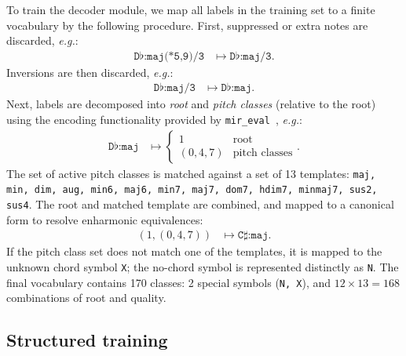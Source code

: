 \documentclass{article}
\def\eg{\emph{e.g.\/}}
\begin{document}
To train the decoder module, we map all labels in the training set to a finite vocabulary by the following procedure.
First, suppressed or extra notes are discarded, \eg:
\begin{align*}
    \texttt{D}\flat\texttt{:maj(*5,9)/3} &\mapsto \texttt{D}\flat\texttt{:maj/3}.
\end{align*}
Inversions are then discarded, \eg:
\begin{align*}
    \texttt{D}\flat\texttt{:maj/3} &\mapsto \texttt{D}\flat\texttt{:maj}.
\end{align*}
Next, labels are decomposed into \emph{root} and \emph{pitch classes} (relative to the root) using the encoding functionality provided by \texttt{mir\_eval}~\cite{raffel2014mir_eval}, \eg:
\begin{align*}
    \texttt{D}\flat\texttt{:maj} &\mapsto \begin{cases}
        1 & \text{root}\\
        (0, 4, 7) & \text{pitch classes}
    \end{cases}.
\end{align*}
The set of active pitch classes is matched against a set of 13 templates: \texttt{maj, min, dim, aug, min6, maj6, min7, maj7, dom7, hdim7, minmaj7, sus2, sus4}.
The root and matched template are combined, and mapped to a canonical form to resolve enharmonic equivalences:
\begin{align*}
    \left(1, (0, 4, 7) \right) &\mapsto \texttt{C}\sharp\texttt{:maj}.
\end{align*}
If the pitch class set does not match one of the templates, it is mapped to the unknown chord symbol \texttt{X}; the no-chord symbol is represented distinctly as \texttt{N}.
The final vocabulary contains 170 classes: 2 special symbols (\texttt{N, X}), and $12\times13=168$ combinations of root and quality.


\subsection{Structured training}


%       
\end{document}
